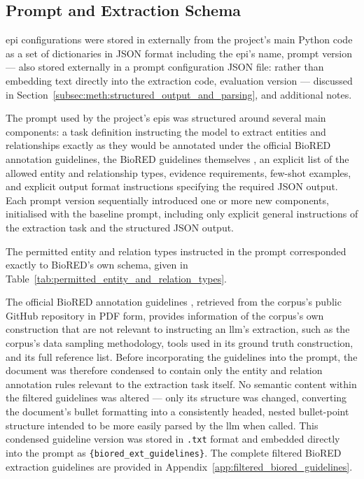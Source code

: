 \subsection{Prompt and Extraction Schema}
\label{subsec:meth:prompt_and_extraction_schema}
\gls{epi} configurations were stored in externally from the project's main Python code as a set of dictionaries in JSON format including the \gls{epi}'s name, prompt version --- also stored externally in a prompt configuration JSON file: rather than embedding text directly into the extraction code, evaluation version --- discussed in Section~\ref{subsec:meth:structured_output_and_parsing}, and additional notes.

The prompt used by the project's \glspl{epi} was structured around several main components: a task definition instructing the model to extract entities and relationships exactly as they would be annotated under the official BioRED annotation guidelines, the BioRED guidelines themselves \cite{luo2022_biored}, an explicit list of the allowed entity and relationship types, evidence requirements, few-shot examples, and explicit output format instructions specifying the required JSON output. Each prompt version sequentially introduced one or more new components, initialised with the baseline prompt, including only explicit general instructions of the extraction task and the structured JSON output.

The permitted entity and relation types instructed in the prompt corresponded exactly to BioRED's own schema, given in Table~\ref{tab:permitted_entity_and_relation_types}.

The official BioRED annotation guidelines \cite{luo2022_biored}, retrieved from the corpus's public GitHub repository in PDF form, provides information of the corpus's own construction that are not relevant to instructing an \gls{llm}'s extraction, such as the corpus's data sampling methodology, tools used in its ground truth construction, and its full reference list. Before incorporating the guidelines into the prompt, the document was therefore condensed to contain only the entity and relation annotation rules relevant to the extraction task itself. No semantic content within the filtered guidelines was altered --- only its structure was changed, converting the document's bullet formatting into a consistently headed, nested bullet-point structure intended to be more easily parsed by the \gls{llm} when called. This condensed guideline version was stored in \texttt{.txt} format and embedded directly into the prompt as \texttt{\{biored\_ext\_guidelines\}}. The complete filtered BioRED extraction guidelines are provided in Appendix~\ref{app:filtered_biored_guidelines}.


